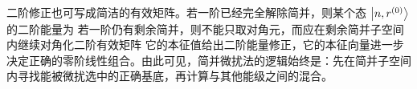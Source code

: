 二阶修正也可写成简洁的有效矩阵。若一阶已经完全解除简并，则某个态 $\ket{n,r^{(0)}}$ 的二阶能量为
若一阶仍有剩余简并，则不能只取对角元，而应在剩余简并子空间内继续对角化二阶有效矩阵
它的本征值给出二阶能量修正，它的本征向量进一步决定正确的零阶线性组合。由此可见，简并微扰法的逻辑始终是：先在简并子空间内寻找能被微扰选中的正确基底，再计算与其他能级之间的混合。
